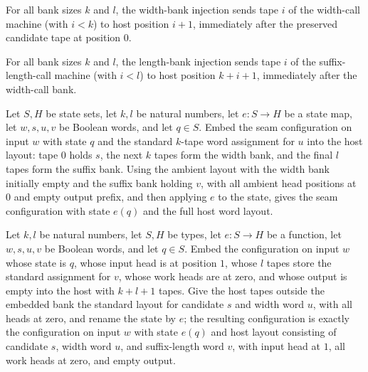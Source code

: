 \begin{definition}
\label{Turing.FinTM.emitterP2LeftIndex}
\leanok
For all bank sizes $k$ and $l$, the width-bank injection sends tape $i$ of the
width-call machine (with $i < k$) to host position $i + 1$, immediately
after the preserved candidate tape at position $0$.
\end{definition}

\begin{definition}
\label{Turing.FinTM.emitterP2RightIndex}
\leanok
For all bank sizes $k$ and $l$, the length-bank injection sends tape $i$ of the
suffix-length-call machine (with $i < l$) to host position $k + i + 1$,
immediately after the width-call bank.
\end{definition}

\begin{lemma}
\label{Turing.FinTM.emitterP2_left_frame}
\leanok
{}
Let $S,H$ be state sets, let $k,l$ be natural numbers, let $e:S\to H$ be a state map,
let $w,s,u,v$ be Boolean words, and let $q\in S$. Embed the seam configuration on input
$w$ with state $q$ and the standard $k$-tape word assignment for $u$ into the host
layout: tape $0$ holds $s$, the next $k$ tapes form the width bank, and the final $l$
tapes form the suffix bank. Using the ambient layout with the width bank initially empty
and the suffix bank holding $v$, with all ambient head positions at $0$ and empty output
prefix, and then applying $e$ to the state, gives the seam configuration with state
$e(q)$ and the full host word layout.
\end{lemma}

\begin{lemma}
\label{Turing.FinTM.emitterP2_right_frame}
\leanok
{}
Let $k,l$ be natural numbers, let $S,H$ be types, let $e:S\to H$ be a function, let
$w,s,u,v$ be Boolean words, and let $q\in S$. Embed the configuration on input $w$ whose
state is $q$, whose input head is at position $1$, whose $l$ tapes store the standard
assignment for $v$, whose work heads are at zero, and whose output is empty into the
host with $k+l+1$ tapes. Give the host tapes outside the embedded bank the standard
layout for candidate $s$ and width word $u$, with all heads at zero, and rename the
state by $e$; the resulting configuration is exactly the configuration on input $w$ with
state $e(q)$ and host layout consisting of candidate $s$, width word $u$, and
suffix-length word $v$, with input head at $1$, all work heads at zero, and empty
output.
\end{lemma}

